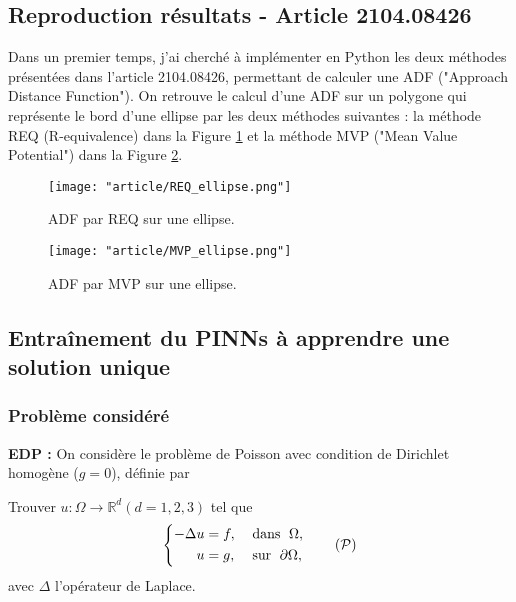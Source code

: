 \graphicspath{{weeks/images/week_4/}}

\subsection{Reproduction résultats - Article 2104.08426}

Dans un premier temps, j'ai cherché à implémenter en Python les deux méthodes présentées dans l'article 2104.08426, permettant de calculer une ADF ("Approach Distance Function"). On retrouve le calcul d'une ADF sur un polygone qui représente le bord d'une ellipse par les deux méthodes suivantes :  la méthode REQ (R-equivalence) dans la Figure \ref{REQ} et la méthode MVP ("Mean Value Potential") dans la Figure \ref{MVP}.

\begin{minipage}{0.38\linewidth}
	\begin{figure}[H]
		\centering
		\texttt{[image: "article/REQ\_ellipse.png"]}
		\caption{ADF par REQ sur une ellipse.}
		\label{REQ}
	\end{figure}
\end{minipage}
\begin{minipage}{0.58\linewidth}
	\begin{figure}[H]
		\centering
		\texttt{[image: "article/MVP\_ellipse.png"]}
		\caption{ADF par MVP sur une ellipse.}
		\label{MVP}
	\end{figure}
\end{minipage}

\subsection{Entraînement du PINNs à apprendre une solution unique}

\subsubsection{Problème considéré}

\textbf{EDP :} On considère le problème de Poisson avec condition de Dirichlet homogène ($g=0$), définie par

Trouver $u : \Omega \rightarrow \mathbb{R}^d (d=1,2,3)$ tel que
\begin{equation}
	\left\{
	\begin{aligned}
		-\Delta u &= f, \; &&\text{dans } \; \Omega, \\
		u&=g, \; &&\text{sur } \; \partial\Omega,
	\end{aligned}
	\right. \tag{$\mathcal{P}$} \label{pb_initial}
\end{equation}
avec $\Delta$ l'opérateur de Laplace.

